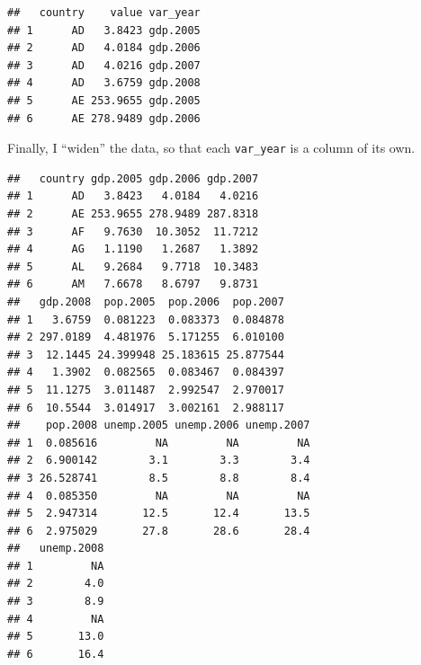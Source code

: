 \documentclass[12pt,oneside,openany]{tufte-book}
\newenvironment{Shaded}{}{}
\newcommand{\KeywordTok}[1]{\textcolor[rgb]{0.00,0.44,0.13}{\textbf{{#1}}}}
\newcommand{\DataTypeTok}[1]{\textcolor[rgb]{0.56,0.13,0.00}{{#1}}}
\newcommand{\StringTok}[1]{\textcolor[rgb]{0.25,0.44,0.63}{{#1}}}
\newcommand{\NormalTok}[1]{{#1}}
\begin{document}
\begin{Shaded}
\end{Shaded}

\begin{verbatim}
##   country    value var_year
## 1      AD   3.8423 gdp.2005
## 2      AD   4.0184 gdp.2006
## 3      AD   4.0216 gdp.2007
## 4      AD   3.6759 gdp.2008
## 5      AE 253.9655 gdp.2005
## 6      AE 278.9489 gdp.2006
\end{verbatim}

Finally, I ``widen'' the data, so that each \texttt{var\_year} is a
column of its own.

\begin{Shaded}
\end{Shaded}

\begin{verbatim}
##   country gdp.2005 gdp.2006 gdp.2007
## 1      AD   3.8423   4.0184   4.0216
## 2      AE 253.9655 278.9489 287.8318
## 3      AF   9.7630  10.3052  11.7212
## 4      AG   1.1190   1.2687   1.3892
## 5      AL   9.2684   9.7718  10.3483
## 6      AM   7.6678   8.6797   9.8731
##   gdp.2008  pop.2005  pop.2006  pop.2007
## 1   3.6759  0.081223  0.083373  0.084878
## 2 297.0189  4.481976  5.171255  6.010100
## 3  12.1445 24.399948 25.183615 25.877544
## 4   1.3902  0.082565  0.083467  0.084397
## 5  11.1275  3.011487  2.992547  2.970017
## 6  10.5544  3.014917  3.002161  2.988117
##    pop.2008 unemp.2005 unemp.2006 unemp.2007
## 1  0.085616         NA         NA         NA
## 2  6.900142        3.1        3.3        3.4
## 3 26.528741        8.5        8.8        8.4
## 4  0.085350         NA         NA         NA
## 5  2.947314       12.5       12.4       13.5
## 6  2.975029       27.8       28.6       28.4
##   unemp.2008
## 1         NA
## 2        4.0
## 3        8.9
## 4         NA
## 5       13.0
## 6       16.4
\end{verbatim}
\end{document}
